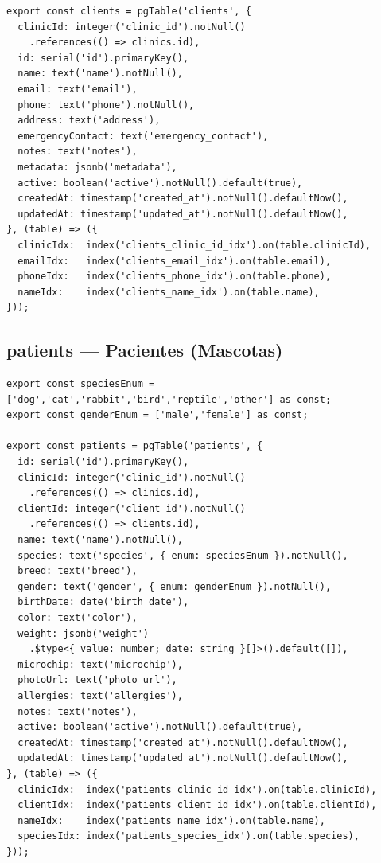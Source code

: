 \begin{lstlisting}[style=typescript, caption=Esquema clients]
export const clients = pgTable('clients', {
  clinicId: integer('clinic_id').notNull()
    .references(() => clinics.id),
  id: serial('id').primaryKey(),
  name: text('name').notNull(),
  email: text('email'),
  phone: text('phone').notNull(),
  address: text('address'),
  emergencyContact: text('emergency_contact'),
  notes: text('notes'),
  metadata: jsonb('metadata'),
  active: boolean('active').notNull().default(true),
  createdAt: timestamp('created_at').notNull().defaultNow(),
  updatedAt: timestamp('updated_at').notNull().defaultNow(),
}, (table) => ({
  clinicIdx:  index('clients_clinic_id_idx').on(table.clinicId),
  emailIdx:   index('clients_email_idx').on(table.email),
  phoneIdx:   index('clients_phone_idx').on(table.phone),
  nameIdx:    index('clients_name_idx').on(table.name),
}));
\end{lstlisting}

\subsection{patients --- Pacientes (Mascotas)}

\begin{lstlisting}[style=typescript, caption=Esquema patients]
export const speciesEnum = ['dog','cat','rabbit','bird','reptile','other'] as const;
export const genderEnum = ['male','female'] as const;

export const patients = pgTable('patients', {
  id: serial('id').primaryKey(),
  clinicId: integer('clinic_id').notNull()
    .references(() => clinics.id),
  clientId: integer('client_id').notNull()
    .references(() => clients.id),
  name: text('name').notNull(),
  species: text('species', { enum: speciesEnum }).notNull(),
  breed: text('breed'),
  gender: text('gender', { enum: genderEnum }).notNull(),
  birthDate: date('birth_date'),
  color: text('color'),
  weight: jsonb('weight')
    .$type<{ value: number; date: string }[]>().default([]),
  microchip: text('microchip'),
  photoUrl: text('photo_url'),
  allergies: text('allergies'),
  notes: text('notes'),
  active: boolean('active').notNull().default(true),
  createdAt: timestamp('created_at').notNull().defaultNow(),
  updatedAt: timestamp('updated_at').notNull().defaultNow(),
}, (table) => ({
  clinicIdx:  index('patients_clinic_id_idx').on(table.clinicId),
  clientIdx:  index('patients_client_id_idx').on(table.clientId),
  nameIdx:    index('patients_name_idx').on(table.name),
  speciesIdx: index('patients_species_idx').on(table.species),
}));
\end{lstlisting}

